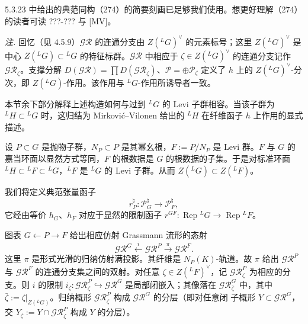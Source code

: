  5.3.23 中给出的典范同构（274）的简要刻画已足够我们使用。想更好理解（274）的读者可读 ???-??? 与 [MV]。



\emph{注.} 回忆（见 4.5.9）$\mathcal{GR}$ 的连通分支由 $Z({}^{L}G)^{\vee}$ 的元素标号；这里 $Z({}^{L}G)^{\vee}$ 是中心 $Z({}^{L}G)\subset{}^{L}G$ 的特征标群。$\mathcal{GR}$ 中相应于 $\zeta\in Z({}^{L}G)^{\vee}$ 的连通分支记作 $\mathcal{GR}_{\zeta}$。支撑分解 $D(\mathcal{GR})=\prod D(\mathcal{GR}_{\zeta})$、$\mathcal{P}=\oplus\mathcal{P}_{\zeta}$ 定义了 $h$ 上的 $Z({}^{L}G)^{\vee}$-分次，即 $Z({}^{L}G)$-作用。该作用与 ${}^{L}G$-作用所诱导者一致。

本节余下部分解释上述构造如何与过到 ${}^{L}G$ 的 Levi 子群相容。当该子群为 ${}^{L}H\subset{}^{L}G$ 时，这归结为 Mirković–Vilonen 给出的 ${}^{L}H$ 在纤维函子 $h$ 上作用的显式描述。

 设 $P\subset G$ 是抛物子群，$N_P\subset P$ 是其幂幺根，$F:=P/N_P$ 是 Levi 群。$F$ 与 $G$ 的嘉当环面以显然方式等同，$F$ 的根数据是 $G$ 的根数据的子集。于是对标准环面 ${}^{L}H\subset{}^{L}F\subset{}^{L}G$，${}^{L}F$ 是 ${}^{L}G$ 的 Levi 子群。从而 $Z({}^{L}G)\subset Z({}^{L}F)$。

我们将定义典范张量函子
\begin{equation}\tag{278}
r_P^{\natural}:\mathcal{P}_G^{\natural}\to\mathcal{P}_F^{\natural},
\end{equation}
它经由等价 $h_G$、$h_F$ 对应于显然的限制函子 $r^{GF}:\operatorname{Rep}{}^{L}G\to\operatorname{Rep}{}^{L}F$。

 图表 $G\leftarrow P\rightarrow F$ 给出相应仿射 Grassmann 流形的态射
\begin{equation}\tag{279}
\mathcal{GR}^G\xleftarrow{i}\mathcal{GR}^P\xrightarrow{\pi}\mathcal{GR}^F.
\end{equation}
这里 $\pi$ 是形式光滑的归纳仿射满投影。其纤维是 $N_P(K)$-轨道。故 $\pi$ 给出 $\mathcal{GR}^P$ 与 $\mathcal{GR}^F$ 的连通分支集之间的双射。对任意 $\zeta\in Z({}^{L}F)^{\vee}$，记 $\mathcal{GR}^P_{\zeta}$ 为相应的分支。则 $i$ 的限制 $i_{\zeta}:\mathcal{GR}^P_{\zeta}\hookrightarrow\mathcal{GR}^G$ 是局部闭嵌入；其像落在 $\mathcal{GR}^G_{\bar{\zeta}}$ 中，其中 $\bar{\zeta}:=\zeta|_{Z({}^{L}G)}$。归纳概形 $\mathcal{GR}^P_{\zeta}$ 构成 $\mathcal{GR}^G$ 的分层（即对任意闭
子概形 $Y\subset\mathcal{GR}^G$，交 $Y_{\zeta}:=Y\cap\mathcal{GR}^P_{\zeta}$ 构成 $Y$ 的分层）。

